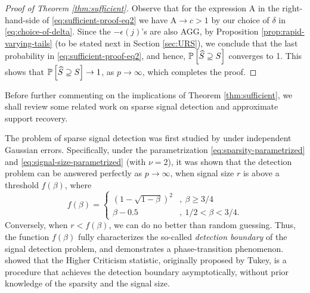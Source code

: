 \begin{proof}[Proof of Theorem \ref{thm:sufficient}]
Observe that for the expression $\text{A}$ in the right-hand-side of \eqref{eq:sufficient-proof-eq2} we have $\text{A}\to c>1$ by our choice of $\delta$ in \eqref{eq:choice-of-delta}.
Since the $-\epsilon(j)$'s are also AGG, by Proposition \ref{prop:rapid-varying-tails} (to be stated next in Section \ref{sec:URS}), we conclude that the last probability in \eqref{eq:sufficient-proof-eq2}, and hence,
$\P\left[\widehat{S} \supseteq S\right]$ converges to 1. 
This shows that $\P\left[\widehat{S}\supseteq S\right]\to 1$, as $p\to\infty$, which completes the proof.
\end{proof}


Before further commenting on the implications of Theorem \ref{thm:sufficient}, we shall review some related work on sparse signal detection and approximate support recovery.

The problem of sparse signal detection was first studied by \citet*{ingster1998minimax} under independent Gaussian errors.
Specifically, under the parametrization \eqref{eq:sparsity-parametrized} and \eqref{eq:signal-size-parametrized} (with $\nu=2$), it was shown that the detection problem can be answered perfectly as $p\to\infty$, when signal size $r$ is above a threshold $f(\beta)$, where
\begin{equation} \label{eq:detection-boundary}
f(\beta) = \begin{cases}
\left(1 - \sqrt{1 - \beta}\right)^2 &,\ \beta\ge3/4\\
\beta - 0.5 &,\ 1/2<\beta<3/4.
\end{cases}
\end{equation}
Conversely, when $r<f(\beta)$, we can do no better than random guessing. 
Thus, the function $f(\beta)$ fully characterizes the so-called \emph{detection boundary} of the signal detection problem, and demonstrates a phase-transition phenomenon. 
\citet*{donoho2004higher} showed that the Higher Criticism statistic, originally proposed by Tukey, is a procedure that achieves the detection boundary asymptotically, without prior knowledge of the sparsity and the signal size.

